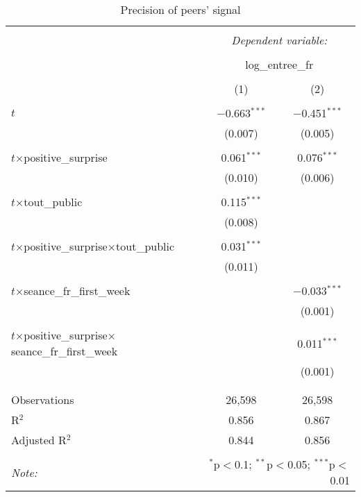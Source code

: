 \begin{table}[!htbp] \centering 
  \caption{Precision of peers' signal} 
  \label{precisionsignal} 
\begin{tabular}{@{\extracolsep{5pt}}lcc} 
\\[-1.8ex]\hline 
\hline \\[-1.8ex] 
 & \multicolumn{2}{c}{\textit{Dependent variable:}} \\ 
\cline{2-3} 
\\[-1.8ex] & \multicolumn{2}{c}{log\_entree\_fr} \\ 
\\[-1.8ex] & (1) & (2)\\ 
\hline \\[-1.8ex] 
 $t$ & $-$0.663$^{***}$ & $-$0.451$^{***}$ \\ 
  & (0.007) & (0.005) \\ 
  & & \\ 
 $t$$\times$positive\_surprise & 0.061$^{***}$ & 0.076$^{***}$ \\ 
  & (0.010) & (0.006) \\ 
  & & \\ 
 $t$$\times$tout\_public & 0.115$^{***}$ &  \\ 
  & (0.008) &  \\ 
  & & \\ 
 $t$$\times$positive\_surprise$\times$tout\_public & 0.031$^{***}$ &  \\ 
  & (0.011) &  \\ 
  & & \\ 
 $t$$\times$seance\_fr\_first\_week &  & $-$0.033$^{***}$ \\ 
  &  & (0.001) \\ 
  & & \\ 
 $t$$\times$positive\_surprise$\times$seance\_fr\_first\_week &  & 0.011$^{***}$ \\ 
  &  & (0.001) \\ 
  & & \\ 
\hline \\[-1.8ex] 
Observations & 26,598 & 26,598 \\ 
R$^{2}$ & 0.856 & 0.867 \\ 
Adjusted R$^{2}$ & 0.844 & 0.856 \\ 
\hline 
\hline \\[-1.8ex] 
\textit{Note:}  & \multicolumn{2}{r}{$^{*}$p$<$0.1; $^{**}$p$<$0.05; $^{***}$p$<$0.01} \\ 
\end{tabular} 
\end{table}

